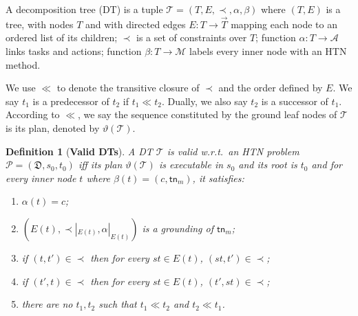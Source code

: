 \documentclass[letterpaper]{article} %
\newtheorem{definition}{Definition}
\newcommand{\Actions}{\mathcal{A}}
\newcommand{\Operators}{\mathcal{O}}
\newcommand{\Cactions}{\mathcal{C}}
\newcommand{\Cname}{\Cactions}
\newcommand{\HtnDomain}{\mathfrak{D}}
\newcommand{\Methods}{\mathcal{M}}
\newcommand{\Method}{\Methods}
\newcommand{\HtnProblem}{\mathcal{P}}
\newcommand{\Constraint}{\prec}
\newcommand{\Constraints}{\Constraint}
\newcommand{\ctop}{t_I}
\newcommand{\tn}{\mathsf{tn}}
\newcommand{\Dtree}{\mathcal{T}}
\newcommand{\ch}{\mathsf{ch}}
\newcommand{\sub}{\mathsf{sub}}
\newcommand{\yield}{\vartheta}
\newcommand{\aspprec}{\ll}
\begin{document}
A decomposition tree (DT) is a tuple $\Dtree = (T,E,\Constraints,\alpha,\beta)$
where
  $(T,E)$ is a tree, with nodes $T$ and with directed edges $E: T \longrightarrow \vec{T}$ mapping each node to an ordered list of its children;
  $\Constraints$ is a set of constraints over $T$;
  function $\alpha: T \longrightarrow \Actions$ links tasks and actions; %
  function $\beta: T \longrightarrow \Method$ labels every inner node with an HTN method. %


We use $\aspprec$ to denote the transitive closure of $\Constraints$ and the order defined by $E$. We say $t_1$ is a predecessor of $t_2$ if $t_1 \aspprec t_2$.
Dually, we also say $t_2$ is a successor of $t_1$.
According to $\aspprec$, we say the sequence constituted by the ground leaf nodes of $\Dtree$ is its plan, denoted by $\yield(\Dtree)$.

\begin{definition}[\textbf{Valid DTs}]\label{def_valid_decomp_tree}
A DT $\Dtree$ is valid \emph{w.r.t.}\ an HTN problem %
$\HtnProblem = (\HtnDomain,s_0,t_0)$
iff its plan $\yield(\Dtree)$ is executable in $s_0$ and
its root is $t_0$ %
and for every inner node $t$ where $\beta(t)=(c,\tn_m)$, it satisfies:
\begin{enumerate}
  \item $\alpha(t)=c$;
  \item %
  $(E(t),\Constraints\!|_{E(t)},\alpha |_{E(t)})$ is a grounding of $\tn_m$;
  \item if $(t, t')\in \Constraints$ then for every $st \in E(t)$, $(st,t') \in \Constraints$; %
  \item if $(t', t)\in \Constraints$ then for every $st \in E(t)$, $(t', st) \in \Constraints$; %
  \item there are no $t_1,t_2$ such that $t_1 \aspprec t_2$ and $t_2 \aspprec t_1$.
\end{enumerate}
\end{definition}
\end{document}
